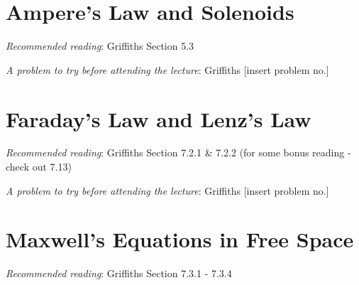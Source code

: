 \documentclass[
  letterpaper,
  DIV=11,
  numbers=noendperiod]{scrreprt}
\begin{document}

\chapter{Ampere's Law and Solenoids}\label{amperes-law-and-solenoids}

\newcommand{\l}{\mathrm{\mathbf{l}}}
\newcommand{\E}{\mathrm{\mathbf{E}}}
\newcommand{\F}{\mathrm{\mathbf{F}}}
\newcommand{\r}{\mathrm{\mathbf{r}}}

\newcommand{\x}{\mathrm{\mathbf{x}}}
\newcommand{\y}{\mathrm{\mathbf{y}}}
\newcommand{\z}{\mathrm{\mathbf{z}}}

\emph{Recommended reading}: Griffiths Section 5.3

\emph{A problem to try before attending the lecture}: Griffiths
{[}insert problem no.{]}


\chapter{Faraday's Law and Lenz's Law}\label{faradays-law-and-lenzs-law}

\newcommand{\l}{\mathrm{\mathbf{l}}}
\newcommand{\E}{\mathrm{\mathbf{E}}}
\newcommand{\F}{\mathrm{\mathbf{F}}}
\newcommand{\r}{\mathrm{\mathbf{r}}}

\newcommand{\x}{\mathrm{\mathbf{x}}}
\newcommand{\y}{\mathrm{\mathbf{y}}}
\newcommand{\z}{\mathrm{\mathbf{z}}}

\emph{Recommended reading}: Griffiths Section 7.2.1 \& 7.2.2 (for some
bonus reading - check out 7.13)

\emph{A problem to try before attending the lecture}: Griffiths
{[}insert problem no.{]}


\chapter{Maxwell's Equations in Free
Space}\label{maxwells-equations-in-free-space}

\newcommand{\l}{\mathrm{\mathbf{l}}}
\newcommand{\E}{\mathrm{\mathbf{E}}}
\newcommand{\F}{\mathrm{\mathbf{F}}}
\newcommand{\r}{\mathrm{\mathbf{r}}}

\newcommand{\x}{\mathrm{\mathbf{x}}}
\newcommand{\y}{\mathrm{\mathbf{y}}}
\newcommand{\z}{\mathrm{\mathbf{z}}}

\emph{Recommended reading}: Griffiths Section 7.3.1 - 7.3.4
\end{document}
